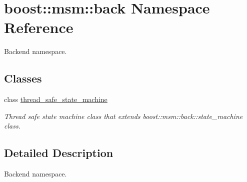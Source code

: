 \hypertarget{namespaceboost_1_1msm_1_1back}{\section{boost\-:\-:msm\-:\-:back Namespace Reference}
\label{namespaceboost_1_1msm_1_1back}
}


Backend namespace.  


\subsection*{Classes}
\begin{DoxyCompactItemize}
\item 
class \hyperlink{classboost_1_1msm_1_1back_1_1thread__safe__state__machine}{thread\-\_\-safe\-\_\-state\-\_\-machine}
\begin{DoxyCompactList}\small\item\em Thread safe state machine class that extends boost\-::msm\-::back\-::state\-\_\-machine class. \end{DoxyCompactList}\end{DoxyCompactItemize}


\subsection{Detailed Description}
Backend namespace. 